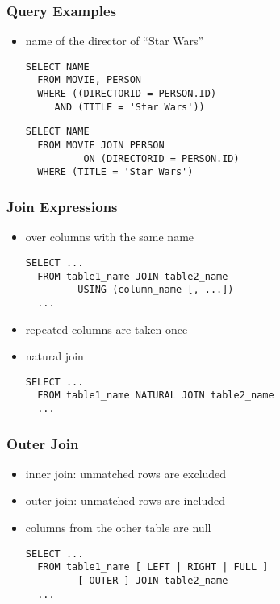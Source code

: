 \documentclass[dvipsnames]{beamer}
\theoremstyle{plain}
\begin{document}
\begin{frame}[fragile]
  \frametitle{Query Examples}

  \begin{itemize}
    \item name of the director of ``Star Wars''
    \begin{lstlisting}
SELECT NAME
  FROM MOVIE, PERSON
  WHERE ((DIRECTORID = PERSON.ID)
     AND (TITLE = 'Star Wars'))
    \end{lstlisting}

    \pause
    \begin{lstlisting}
SELECT NAME
  FROM MOVIE JOIN PERSON
          ON (DIRECTORID = PERSON.ID)
  WHERE (TITLE = 'Star Wars')
    \end{lstlisting}
  \end{itemize}
\end{frame}

\begin{frame}[fragile]
  \frametitle{Join Expressions}

  \begin{itemize}
    \item over columns with the same name
    \begin{lstlisting}
SELECT ...
  FROM table1_name JOIN table2_name
         USING (column_name [, ...])
  ...
    \end{lstlisting}
    \item repeated columns are taken once

    \pause
    \medskip
    \item natural join
    \begin{lstlisting}
SELECT ...
  FROM table1_name NATURAL JOIN table2_name
  ...
    \end{lstlisting}
  \end{itemize}
\end{frame}

\begin{frame}[fragile]
  \frametitle{Outer Join}

  \begin{itemize}
    \item inner join: unmatched rows are excluded

    \medskip
    \item \alert{outer join}: unmatched rows are included
    \item columns from the other table are null
    \begin{lstlisting}
SELECT ...
  FROM table1_name [ LEFT | RIGHT | FULL ]
         [ OUTER ] JOIN table2_name
  ...
    \end{lstlisting}
  \end{itemize}
\end{frame}
\end{document}

